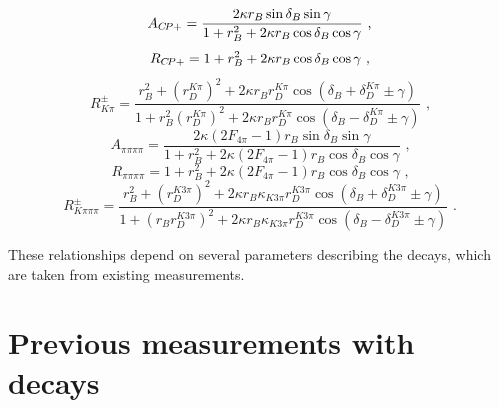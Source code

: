 \begin{equation}
A_{{C\!P}+} = \frac{2 \kappa r_B\sin\delta_B\sin\gamma}{1 + r_B^2 + 2 \kappa r_B\cos\delta_B\cos\gamma} \text{ ,}
\label{exp_Acp}
\end{equation}
\begin{equation}
R_{{C\!P}+} = 1 + r_B^2 + 2 \kappa r_B\cos\delta_B\cos\gamma \text{ ,}
\label{exp_Rcp}
\end{equation}
\begin{equation}
R^{\pm}_{K\pi} = \frac{r_B^2 + \left(r_D^{K\pi}\right)^2 + 2\kappa r_B r_D^{K\pi} \cos(\delta_B + \delta_D^{K\pi} \pm \gamma)}{1 + r_B^2\left(r_D^{K\pi}\right)^2 + 2\kappa r_B r_D^{K\pi} \cos(\delta_B - \delta_D^{K\pi} \pm \gamma)} \text{ ,}
\label{exp_Rpm}
\end{equation}
\begin{equation}
A_{\pi\pi\pi\pi} = \frac{2 \kappa\left(2F_{4\pi} - 1\right) r_B\sin\delta_B\sin\gamma}{1 + r_B^2 + 2 \kappa\left(2F_{4\pi} - 1\right) r_B\cos\delta_B\cos\gamma} \text{ ,}
\label{exp_A4pi}
\end{equation}
\begin{equation}
R_{\pi\pi\pi\pi} = 1 + r_B^2 + 2 \kappa\left(2F_{4\pi} - 1\right) r_B\cos\delta_B\cos\gamma \text{ ,}
\label{exp_R4pi}
\end{equation}
\begin{equation}
R^{\pm}_{K\pi\pi\pi} = \frac{r_B^2 + \left(r_D^{K3\pi}\right)^2 + 2\kappa r_B \kappa_{K3\pi} r_D^{K3\pi} \cos(\delta_B + \delta_D^{K3\pi} \pm \gamma)}{1 + \left(r_Br_D^{K3\pi}\right)^2 + 2\kappa r_B \kappa_{K3\pi} r_D^{K3\pi} \cos(\delta_B - \delta_D^{K3\pi} \pm \gamma)} \text{ .}
\label{exp_Rpm4body}
\end{equation}

These relationships depend on several parameters describing the \D decays, which are taken from existing measurements.


\section{Previous \Pgamma measurements with  decays}


